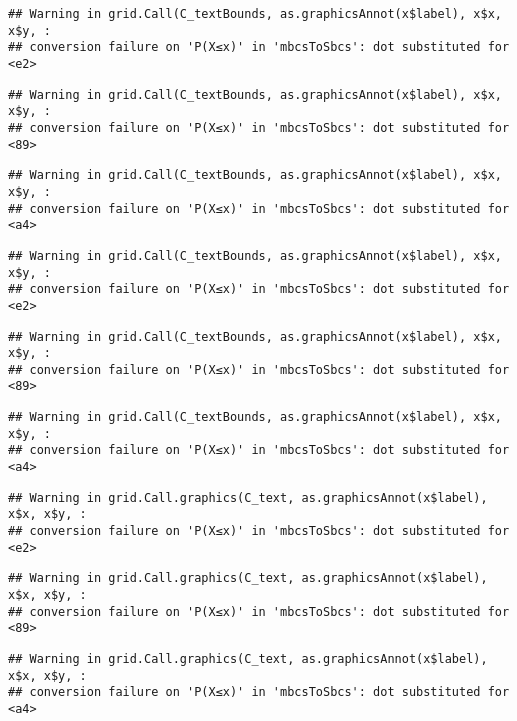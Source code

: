\documentclass[
]{book}
\begin{document}
\begin{verbatim}
## Warning in grid.Call(C_textBounds, as.graphicsAnnot(x$label), x$x, x$y, :
## conversion failure on 'P(X≤x)' in 'mbcsToSbcs': dot substituted for <e2>
\end{verbatim}

\begin{verbatim}
## Warning in grid.Call(C_textBounds, as.graphicsAnnot(x$label), x$x, x$y, :
## conversion failure on 'P(X≤x)' in 'mbcsToSbcs': dot substituted for <89>
\end{verbatim}

\begin{verbatim}
## Warning in grid.Call(C_textBounds, as.graphicsAnnot(x$label), x$x, x$y, :
## conversion failure on 'P(X≤x)' in 'mbcsToSbcs': dot substituted for <a4>
\end{verbatim}

\begin{verbatim}
## Warning in grid.Call(C_textBounds, as.graphicsAnnot(x$label), x$x, x$y, :
## conversion failure on 'P(X≤x)' in 'mbcsToSbcs': dot substituted for <e2>
\end{verbatim}

\begin{verbatim}
## Warning in grid.Call(C_textBounds, as.graphicsAnnot(x$label), x$x, x$y, :
## conversion failure on 'P(X≤x)' in 'mbcsToSbcs': dot substituted for <89>
\end{verbatim}

\begin{verbatim}
## Warning in grid.Call(C_textBounds, as.graphicsAnnot(x$label), x$x, x$y, :
## conversion failure on 'P(X≤x)' in 'mbcsToSbcs': dot substituted for <a4>
\end{verbatim}

\begin{verbatim}
## Warning in grid.Call.graphics(C_text, as.graphicsAnnot(x$label), x$x, x$y, :
## conversion failure on 'P(X≤x)' in 'mbcsToSbcs': dot substituted for <e2>
\end{verbatim}

\begin{verbatim}
## Warning in grid.Call.graphics(C_text, as.graphicsAnnot(x$label), x$x, x$y, :
## conversion failure on 'P(X≤x)' in 'mbcsToSbcs': dot substituted for <89>
\end{verbatim}

\begin{verbatim}
## Warning in grid.Call.graphics(C_text, as.graphicsAnnot(x$label), x$x, x$y, :
## conversion failure on 'P(X≤x)' in 'mbcsToSbcs': dot substituted for <a4>
\end{verbatim}
\end{document}
